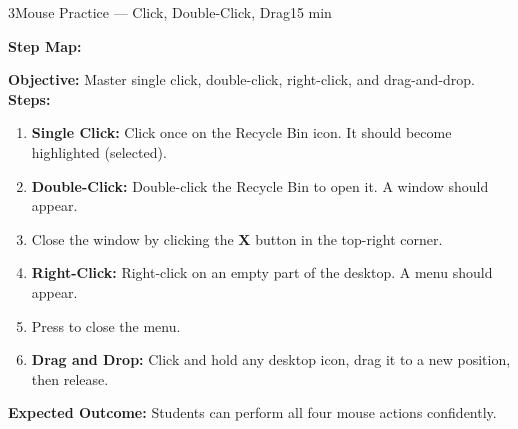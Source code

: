 
\begin{labactivity}{3}{Mouse Practice --- Click, Double-Click, Drag}{15 min}


\textbf{Step Map:}
\begin{center}
\end{center}

\textbf{Objective:} Master single click, double-click, right-click, and drag-and-drop.\\[4pt]
\textbf{Steps:}
\begin{enumerate}[label=\protect\stepcircle{\arabic*}, leftmargin=2cm, itemsep=4pt]
  \item \textbf{Single Click:} Click once on the Recycle Bin icon. It should become highlighted (selected).
  \item \textbf{Double-Click:} Double-click the Recycle Bin to open it. A window should appear.
  \item Close the window by clicking the \textbf{X} button in the top-right corner.
  \item \textbf{Right-Click:} Right-click on an empty part of the desktop. A menu should appear.
  \item Press  to close the menu.
  \item \textbf{Drag and Drop:} Click and hold any desktop icon, drag it to a new position, then release.
\end{enumerate}
\textbf{Expected Outcome:} Students can perform all four mouse actions confidently.

\welldone
\end{labactivity}

